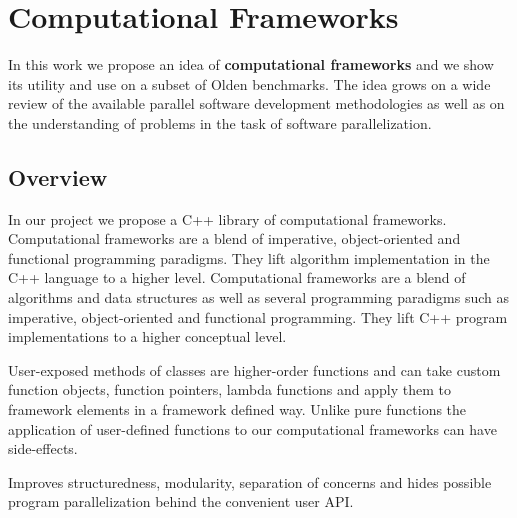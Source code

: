 \documentclass[10pt,a4paper]{report}
\begin{document}
\section{Computational Frameworks}
\quad In this work we propose an idea of \textbf{computational frameworks} and we show its utility and use on a subset of Olden benchmarks. The idea grows on a wide review of the available parallel software development methodologies as well as on the understanding of problems in the task of software parallelization.  

\subsection{Overview}
\quad In our project we propose a C++ library of computational frameworks. Computational frameworks are a blend of imperative, object-oriented and functional programming paradigms. They lift algorithm implementation in the C++ language to a higher level.
Computational frameworks are a blend of algorithms and data structures as well as several programming paradigms such as imperative, object-oriented and functional programming. They lift C++ program implementations to a higher conceptual level. 

User-exposed methods of classes are higher-order functions and can take custom function objects, function pointers, lambda functions and apply them to framework elements in a framework defined way. Unlike pure functions the application of user-defined functions to our computational frameworks can have side-effects.

\quad Improves structuredness, modularity, separation of concerns and hides possible program parallelization behind the convenient user API.  
\end{document}
